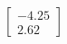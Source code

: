 \documentclass[preview]{standalone}
\begin{document}
\begin{align*}
\begin{bmatrix} -4.25 \\ 2.62 \end{bmatrix}
\end{align*}
\end{document}
